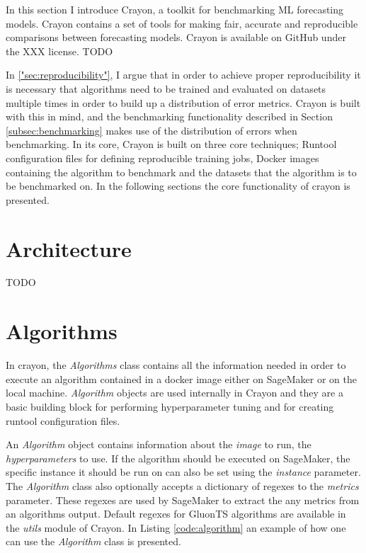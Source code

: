 
In this section I introduce Crayon, a toolkit for benchmarking ML forecasting models. Crayon contains a set of tools for making fair, accurate and reproducible comparisons between forecasting models. Crayon is available on GitHub under the XXX license. TODO

In \ref{"sec:reproducibility"}, I argue that in order to achieve proper reproducibility it is necessary that algorithms need to be trained and evaluated on datasets multiple times in order to build up a distribution of error metrics. Crayon is built with this in mind, and the benchmarking functionality described in Section \ref{subsec:benchmarking} makes use of the distribution of errors when benchmarking. In its core, Crayon is built on three core techniques; Runtool configuration files for defining reproducible training jobs, Docker images containing the algorithm to benchmark and the datasets that the algorithm is to be benchmarked on. In the following sections the core functionality of crayon is presented.

\section{Architecture}
TODO

\section{Algorithms}
\label{crayon:algorithms}
In crayon, the \textit{Algorithms} class contains all the information needed in order to execute an algorithm contained in a docker image either on SageMaker or on the local machine. \textit{Algorithm} objects are used internally in Crayon and they are a basic building block for performing hyperparameter tuning and for creating runtool configuration files.

An \textit{Algorithm} object contains information about the \textit{image} to run, the \textit{hyperparameters} to use. If the algorithm should be executed on SageMaker, the specific instance it should be run on can also be set using the \textit{instance} parameter. The \textit{Algorithm} class also optionally accepts a dictionary of regexes to the \textit{metrics} parameter. These regexes are used by SageMaker to extract the any metrics from an algorithms output. Default regexes for GluonTS algorithms are available in the \textit{utils} module of Crayon. In Listing \ref{code:algorithm} an example of how one can use the \textit{Algorithm} class is presented.

